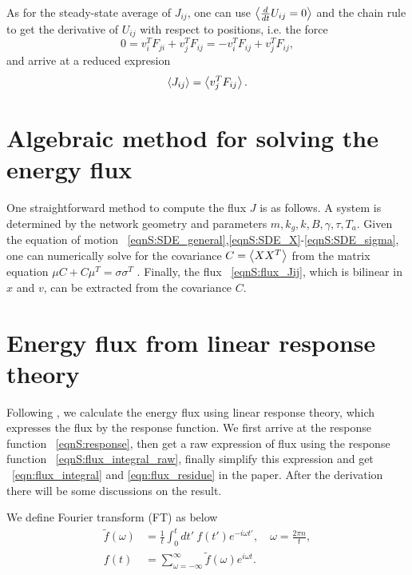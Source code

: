 \documentclass[
 amsmath,amssymb,
 aps,
 pre,
 longbibliography,
 10pt, onecolumn,
 notitlepage
]{revtex4-1}
\begin{document}
As for the steady-state average of $J_{ij}$, one can use $\expval{\frac{d}{dt}U_{ij}=0}$ and the chain rule to get the derivative of $U_{ij}$ with respect to positions, i.e. the force
\begin{equation}
    0 = v_i^T F_{ji} + v_j^T F_{ij}
    = -v_i^T F_{ij} + v_j^T F_{ij},
\end{equation}
and arrive at a reduced expresion
\begin{equation}
    \expval{J_{ij}} = \expval{v_j^T F_{ij}}.
\end{equation}


\section{Algebraic method for solving the energy flux}
One straightforward method to compute the flux $J$ is as follows.
A system is determined by the network geometry and parameters $m, k_g, k, B, \gamma, \tau, T_a$.
Given the equation of motion \eqnname~\eqref{eqnS:SDE_general},\eqref{eqnS:SDE_X}-\eqref{eqnS:SDE_sigma}, one can numerically solve for the covariance $C=\expval{XX^T}$ from the matrix equation $\mu C + C \mu^T = \sigma\sigma^T$ \cite{Gardiner2009ItoCalculus,Ceriotti2010ColoredNoiseThermostats}.
Finally, the flux \eqnname~\eqref{eqnS:flux_Jij}, which is bilinear in $x$ and $v$, can be extracted from the covariance $C$.


\section{Energy flux from linear response theory}
Following \cite{Kundu2011LargeDeviations}, we calculate the energy flux using linear response theory, which expresses the flux by the response function.
We first arrive at the response function \eqnname~\eqref{eqnS:response}, then get a raw expression of flux using the response function \eqnname~\eqref{eqnS:flux_integral_raw}, finally simplify this expression and get \eqnname~\eqref{eqn:flux_integral} and \eqref{eqn:flux_residue} in the paper.
After the derivation there will be some discussions on the result.

We define Fourier transform (FT) as below
\begin{align}
\tilde{f}(\omega) &= \frac{1}{t} \int_0^t dt'\ f(t')e^{-i\omega t'},\quad
\omega = \frac{2\pi n}{t} ,\\
f(t) &= \sum_{\omega=-\infty}^{\infty} \tilde{f}(\omega) e^{i\omega t} .
\end{align}
\end{document}
